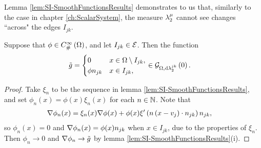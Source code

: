 Lemma \ref{lem:SI-SmoothFunctionsResults} demonstrates to us that, similarly to the case in chapter \ref{ch:ScalarSystem}, the measure $\lambda_2^{\mu}$ cannot see changes ``across" the edges $I_{jk}$.
\begin{lemma} \label{lem:SI-SmoothGradZero}
	Suppose that $\phi\in C^{\infty}_{\#}\left( \Omega \right)$, and let $I_{jk}\in\mathcal{E}$.
	Then the function
	\begin{align*}
		\tilde{g} &= \begin{cases} 0 & x\in\Omega\setminus I_{jk}, \\ \phi n_{jk} & x\in I_{jk}, \end{cases}
		\in\mathcal{G}_{ \Omega, \mathrm{d}\lambda_2^{jk}}\left( 0 \right).
	\end{align*}
\end{lemma}
\begin{proof}
	Take $\xi_n$ to be the sequence in lemma \ref{lem:SI-SmoothFunctionsResults}, and set $\phi_n(x) = \phi(x)\xi_n(x)$ for each $n\in\mathbb{N}$.
	Note that
	\begin{align*}
		\nabla\phi_n(x) &= \xi_n(x)\nabla\phi(x) + \phi(x)\xi'\left( n\left( x-v_j \right)\cdot n_{jk} \right)n_{jk},
	\end{align*}
	so $\phi_n(x) = 0$ and $\nabla\phi_n(x) = \phi(x)n_{jk}$ when $x\in I_{jk}$, due to the properties of $\xi_n$.
	Then $\phi_n\rightarrow0$ and $\nabla\phi_n\rightarrow\tilde{g}$ by lemma \ref{lem:SI-SmoothFunctionsResults}(i).
\end{proof}

